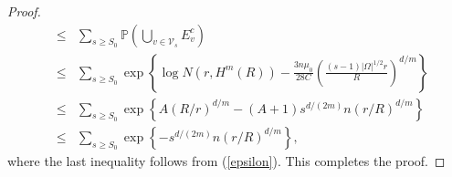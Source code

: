 \documentclass[10pt,a4paper]{amsart}
\begin{document}
\begin{proof}
\begin{eqnarray*}
        &\leq&\sum_{s\geq S_0}\mathbb{P}\left(\bigcup_{v\in \mathcal{V}_s}E_v^c\right)\\
        &\leq&\sum_{s\geq S_0}\exp\left\{\log N(r,H^m(R))-\frac{3n\mu_0}{28C}\left(\frac{(s-1)|\Omega|^{1/2}r}{R}\right)^{d/m}\right\}\\
        &\leq&\sum_{s\geq S_0}\exp\left\{A(R/r)^{d/m}-(A+1)s^{d/(2m)}n(r/R)^{d/m}\right\}\\
        &\leq&\sum_{s\geq S_0}\exp\left\{-s^{d/(2m)}n(r/R)^{d/m}\right\},
    \end{eqnarray*}
    where the last inequality follows from (\ref{epsilon}). This completes the proof.
\end{proof}
\end{document}
